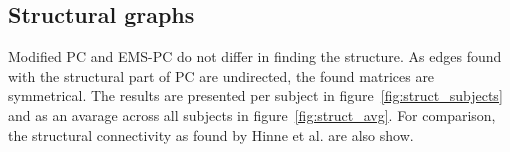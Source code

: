 \documentclass[a4paper, 10pt, english, onecolumn]{article}
\begin{document}
\subsection{Structural graphs}
Modified PC and EMS-PC do not differ in finding the structure.
As edges found with the structural part of PC are undirected, the found matrices are symmetrical.
The results are presented per subject in figure~\ref{fig:struct_subjects} and as an avarage across all subjects in figure~\ref{fig:struct_avg}.
For comparison, the structural connectivity as found by Hinne et al.\cite{hinne2013} are also show. 
\end{document}
